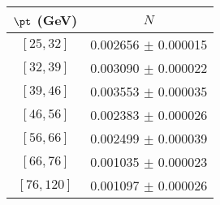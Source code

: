 \begin{tabular}{c||c}
$\pt$ (GeV) & $N$  \\
\hline
$[25, 32]$ & 0.002656 $\pm$ 0.000015\\
$[32, 39]$ & 0.003090 $\pm$ 0.000022\\
$[39, 46]$ & 0.003553 $\pm$ 0.000035\\
$[46, 56]$ & 0.002383 $\pm$ 0.000026\\
$[56, 66]$ & 0.002499 $\pm$ 0.000039\\
$[66, 76]$ & 0.001035 $\pm$ 0.000023\\
$[76, 120]$ & 0.001097 $\pm$ 0.000026\\
\end{tabular}
